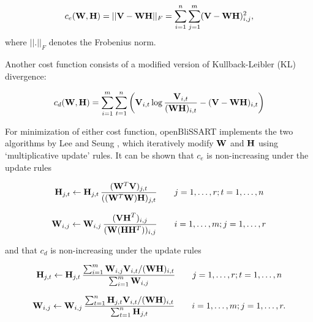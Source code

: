 \begin{equation}
    \label{math:eudist}
    c_e(\mathbf{W},\mathbf{H}) = 
    ||\mathbf{V}-\mathbf{WH}||_F = 
    \sum_{i=1}^n \sum_{j=1}^m (\mathbf{V}-\mathbf{WH})_{i,j}^2 ,
\end{equation}
where $||.||_F$ denotes the Frobenius norm.  

Another cost function consists of a modified version of Kullback-Leibler (KL) divergence:

\begin{equation}
    \label{math:kldiv}
    c_d(\mathbf{W},\mathbf{H}) = \sum\limits_{i=1}^m \sum\limits_{t=1}^n
    \left( \mathbf{V}_{i,t} \log\frac{\mathbf{V}_{i,t}}{(\mathbf{W}\mathbf{H})_{i,t}} - 
    (\mathbf{V} - \mathbf{W}\mathbf{H})_{i,t} \right)
\end{equation}

For minimization of either cost function, openBliSSART implements the two algorithms by
Lee and Seung \cite{LeeSeung2001}, which iteratively modify $\mathbf{W}$ and
$\mathbf{H}$ using `multiplicative update' rules. It can be shown that $c_e$ is
non-increasing under the update rules

\begin{equation}
    \label{math:EDHUpdateRule}
    \mathbf{H}_{j,t} \leftarrow \mathbf{H}_{j,t} \,
    \frac{( \mathbf{W}^T \mathbf{V} )_{j,t}}
         {( (\mathbf{W}^T \mathbf{W})\mathbf{H} )_{j,t}}
    \qquad
    j = 1, \dots, r; t = 1, \dots, n
\end{equation}

\begin{equation}
    \label{math:EDWUpdateRule}
    \mathbf{W}_{i,j} \leftarrow \mathbf{W}_{i,j} \,
    \frac{( \mathbf{VH}^T )_{i,j}}
         {( \mathbf{W} (\mathbf{H}\mathbf{H}^T) )_{i,j}}
    \qquad
     i = 1, \dots, m; j = 1, \dots, r
\end{equation}

\noindent and that $c_d$ is non-increasing under the update rules

\begin{equation}
    \label{math:KLHUpdateRule}
    \mathbf{H}_{j,t} \leftarrow \mathbf{H}_{j,t} \,
    \frac{\sum_{i=1}^m \mathbf{W}_{i,j} \mathbf{V}_{i,t} / (\mathbf{W}\mathbf{H})_{i,t}}
         {\sum_{i=1}^m \mathbf{W}_{i,j}}
    \qquad
    j = 1, \dots, r; t = 1, \dots, n
\end{equation}

\begin{equation}
    \label{math:KLWUpdateRule}
    \mathbf{W}_{i,j} \leftarrow \mathbf{W}_{i,j} \,
    \frac{\sum_{t=1}^n \mathbf{H}_{j,t} \mathbf{V}_{i,t} / (\mathbf{W}\mathbf{H})_{i,t}}
         {\sum_{t=1}^n \mathbf{H}_{j,t}}
    \qquad
     i = 1, \dots, m; j = 1, \dots, r .
\end{equation}

